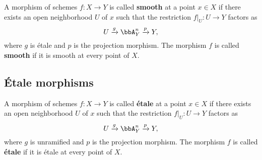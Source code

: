     \begin{definition}
        A morphism of schemes \(f:X\to Y\) is called \textbf{smooth} at a point \(x\in X\) if there exists an open neighborhood \(U\) of \(x\) such that the restriction \(f|_U:U\to Y\) factors as
        \[
            U \xrightarrow{g} \bbA^n_Y \xrightarrow{p} Y,
        \]
        where \(g\) is \'etale and \(p\) is the projection morphism. The morphism \(f\) is called \textbf{smooth} if it is smooth at every point of \(X\).
    \end{definition}


\subsection{\'Etale morphisms}

    \begin{definition}
        A morphism of schemes \(f:X\to Y\) is called \textbf{\'etale} at a point \(x\in X\) if there exists an open neighborhood \(U\) of \(x\) such that the restriction \(f|_U:U\to Y\) factors as
        \[
            U \xrightarrow{g} \bbA^n_Y \xrightarrow{p} Y,
        \]
        where \(g\) is unramified and \(p\) is the projection morphism. The morphism \(f\) is called \textbf{\'etale} if it is \'etale at every point of \(X\).
    \end{definition}

